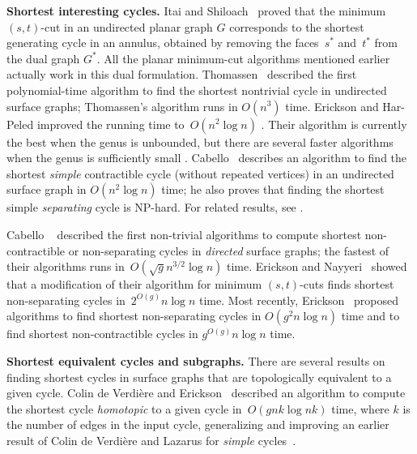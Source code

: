 \documentclass[twoside,leqno,twocolumn]{article}
\def\paragraph#1{\par\medskip\noindent\textbf{#1}}
\begin{document}
\paragraph{Shortest interesting cycles.}
Itai and Shiloach~\cite{is-mfpn-79} proved that the minimum $(s,t)$-cut in an undirected planar graph $G$ corresponds to the shortest generating cycle in an annulus, obtained by removing the faces~$s^*$ and~$t^*$ from the dual graph $G^*$.  All the planar minimum-cut algorithms mentioned earlier actually work in  this dual formulation.  Thomassen~\cite{t-egnsn-90} described the first polynomial-time algorithm to find the shortest nontrivial cycle in undirected surface graphs; Thomassen’s algorithm runs in $O(n^3)$ time.  Erickson and Har-Peled improved the running time to~$O(n^2 \log n)$ \cite{eh-ocsd-04}.  Their algorithm is currently the best when the genus is unbounded, but there are several faster algorithms when the genus is sufficiently small \cite{cm-fsnsn-07, c-mdpg-10, k-csnco-06, cc-msspg-07, insw-iamcmf-11}.  Cabello~\cite{c-fscss-10} describes an algorithm to find the shortest \emph{simple} contractible cycle (without repeated vertices) in an undirected surface graph in $O(n^2\log n)$ time; he also proves that finding the shortest simple \emph{separating} cycle is NP-hard.  For related results, see \cite{ccl-osaew-10, cdem-fotc-10, ccelw-scsih-08, ew-csec-10}.

Cabello \etal~\cite{ccl-fsncd-10} described the first non-trivial algorithms to compute shortest non-contractible or non-separating cycles in \emph{directed} surface graphs; the fastest of their algorithms runs in~$O(\sqrt{g} n^{3/2}\log n)$ time.  Erickson and Nayyeri~\cite{en-mcsnc-11} showed that a modification of their algorithm for minimum $(s,t)$-cuts finds shortest non-separating cycles in~$2^{O(g)}n\log n$ time.  Most recently, Erickson~\cite{e-sncds-11} proposed algorithms to find shortest non-separating cycles in $O(g^2 n \log n)$ time and to find shortest non-contractible cycles in $g^{O(g)} n \log n$ time.

\paragraph{Shortest equivalent cycles and subgraphs.}
There are several results on finding shortest cycles in surface graphs that are topologically equivalent to a given cycle.  Colin de Verdière and Erickson~\cite{ce-tnpcs-10} described an algorithm to compute the shortest cycle \emph{homotopic} to a given cycle in~$O(gnk \log nk)$ time, where $k$ is the number of edges in the input cycle, generalizing and improving an earlier result of Colin de Verdière and Lazarus for \emph{simple} cycles~\cite{cl-opdsh-07}.
\end{document}
